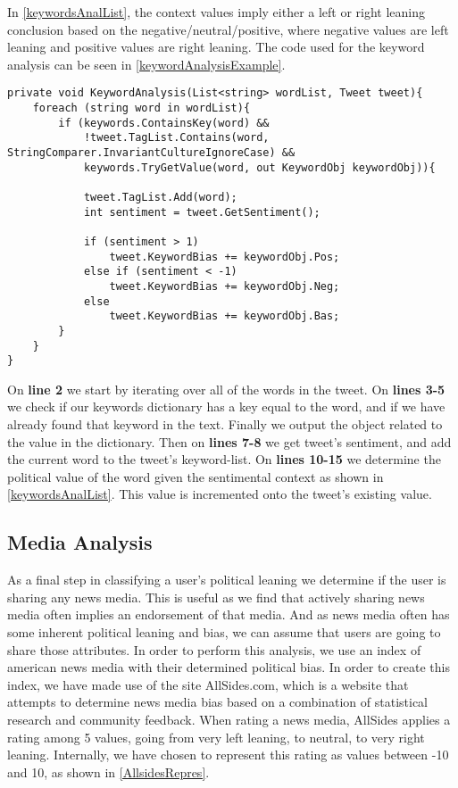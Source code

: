In \autoref{keywordsAnalList}, the context values imply either a left or
right leaning conclusion based on the negative/neutral/positive, where negative
values are left leaning and positive values are right leaning. The code used for
the keyword analysis can be seen in \autoref{keywordAnalysisExample}.\\

\begin{minipage}[H]{\linewidth}
\begin{lstlisting}[caption = Method for handling the keyword analysis, label = keywordAnalysisExample] 
private void KeywordAnalysis(List<string> wordList, Tweet tweet){
	foreach (string word in wordList){
    	if (keywords.ContainsKey(word) && 
            !tweet.TagList.Contains(word, StringComparer.InvariantCultureIgnoreCase) && 
            keywords.TryGetValue(word, out KeywordObj keywordObj)){
                        
        	tweet.TagList.Add(word);
            int sentiment = tweet.GetSentiment();

            if (sentiment > 1)
            	tweet.KeywordBias += keywordObj.Pos;
            else if (sentiment < -1)
            	tweet.KeywordBias += keywordObj.Neg;
            else
            	tweet.KeywordBias += keywordObj.Bas;
		}
	}
}
\end{lstlisting}
\end{minipage}

On \textbf{line 2} we start by iterating over all of the words in the tweet. On
\textbf{lines 3-5} we check if our keywords dictionary has a key equal to the
word, and if we have already found that keyword in the text. Finally we output
the  object related to the value in the dictionary. Then on
\textbf{lines 7-8} we get tweet's sentiment, and  add the current word to the
tweet's keyword-list. On \textbf{lines 10-15} we determine the political value
of the word given the sentimental context as shown in
\autoref{keywordsAnalList}. This value is incremented onto the tweet's existing
 value.

\subsection{Media Analysis}
As a final step in classifying a user's political leaning we determine if the
user is sharing any news media. This is useful as we find that actively sharing
news media often implies an endorsement of that media. And as news media often
has some inherent political leaning and bias, we can assume that users are going
to share those attributes. In order to perform this analysis, we use an index of
american news media with their determined political bias. In order to create
this index, we have made use of the site AllSides.com, which is a website that
attempts to determine news media bias based on a combination of statistical
research and community feedback\citep{allSidesMedia}. When rating a news
media, AllSides applies a rating among 5 values, going from very left
leaning, to neutral, to very right leaning. Internally, we have chosen to
represent this rating as values between -10 and 10, as shown in
\autoref{AllsidesRepres}.\\

